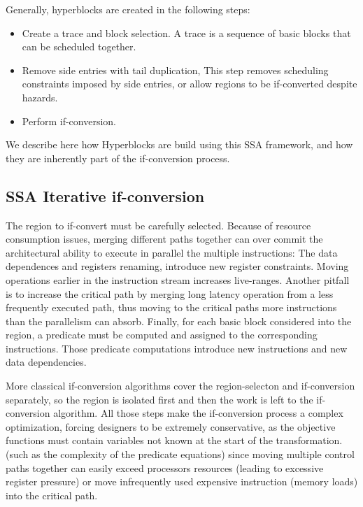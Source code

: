 Generally, hyperblocks are created in the following steps:
\begin{itemize}
\item Create a trace and block selection. A trace is a sequence of basic blocks that can be scheduled together. 
\item Remove side entries with tail duplication, This step removes scheduling constraints imposed by side entries, or allow regions to be if-converted despite hazards.
\item Perform if-conversion.
\end{itemize}

We describe here how Hyperblocks are build using this SSA framework, and how they are inherently part of the if-conversion process.

\subsection{SSA Iterative if-conversion}

The region to if-convert must be carefully selected. Because of resource consumption issues, merging different paths together can over commit the architectural ability to execute in parallel the multiple instructions: The data dependences and registers renaming, introduce new register constraints. Moving operations earlier in the instruction stream increases live-ranges. 
Another pitfall is to increase the critical path by merging long latency operation from a less frequently executed path, thus moving to the critical paths more instructions than the parallelism can absorb.
Finally, for each basic block considered into the region, a predicate must be computed and assigned to the corresponding instructions. Those predicate computations introduce new instructions and new data dependencies.

More classical if-conversion algorithms cover the region-selecton and if-conversion separately, so the region is isolated first and then the work is left to the if-conversion algorithm. All those steps make the if-conversion process a complex optimization, forcing designers to be extremely conservative, as the objective functions must contain variables not known at the start of the transformation. (such as the complexity of the predicate equations) since moving multiple control paths together can easily exceed processors resources (leading to excessive register pressure) or move infrequently used expensive instruction (memory loads) into the critical path. 

